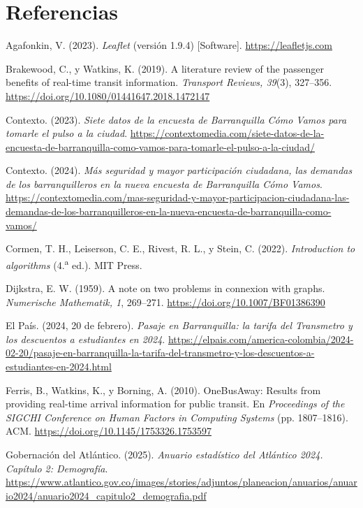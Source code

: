 \documentclass[12pt,letterpaper]{article}
\begin{document}
\section*{Referencias}
\begin{list}{}{\setlength{\leftmargin}{1.27cm}\setlength{\itemindent}{-1.27cm}\setlength{\itemsep}{4pt}}
\item Agafonkin, V. (2023). \textit{Leaflet} (versión 1.9.4) [Software]. \url{https://leafletjs.com}
\item Brakewood, C., y Watkins, K. (2019). A literature review of the passenger benefits of real-time transit information. \textit{Transport Reviews, 39}(3), 327--356. \url{https://doi.org/10.1080/01441647.2018.1472147}
\item Contexto. (2023). \textit{Siete datos de la encuesta de Barranquilla Cómo Vamos para tomarle el pulso a la ciudad}. \url{https://contextomedia.com/siete-datos-de-la-encuesta-de-barranquilla-como-vamos-para-tomarle-el-pulso-a-la-ciudad/}
\item Contexto. (2024). \textit{Más seguridad y mayor participación ciudadana, las demandas de los barranquilleros en la nueva encuesta de Barranquilla Cómo Vamos}. \url{https://contextomedia.com/mas-seguridad-y-mayor-participacion-ciudadana-las-demandas-de-los-barranquilleros-en-la-nueva-encuesta-de-barranquilla-como-vamos/}
\item Cormen, T. H., Leiserson, C. E., Rivest, R. L., y Stein, C. (2022). \textit{Introduction to algorithms} (4.\textsuperscript{a} ed.). MIT Press.
\item Dijkstra, E. W. (1959). A note on two problems in connexion with graphs. \textit{Numerische Mathematik, 1}, 269--271. \url{https://doi.org/10.1007/BF01386390}
\item El País. (2024, 20 de febrero). \textit{Pasaje en Barranquilla: la tarifa del Transmetro y los descuentos a estudiantes en 2024}. \url{https://elpais.com/america-colombia/2024-02-20/pasaje-en-barranquilla-la-tarifa-del-transmetro-y-los-descuentos-a-estudiantes-en-2024.html}
\item Ferris, B., Watkins, K., y Borning, A. (2010). OneBusAway: Results from providing real-time arrival information for public transit. En \textit{Proceedings of the SIGCHI Conference on Human Factors in Computing Systems} (pp. 1807--1816). ACM. \url{https://doi.org/10.1145/1753326.1753597}
\item Gobernación del Atlántico. (2025). \textit{Anuario estadístico del Atlántico 2024. Capítulo 2: Demografía}. \url{https://www.atlantico.gov.co/images/stories/adjuntos/planeacion/anuarios/anuario2024/anuario2024_capitulo2_demografia.pdf}

\end{list}
\end{document}
